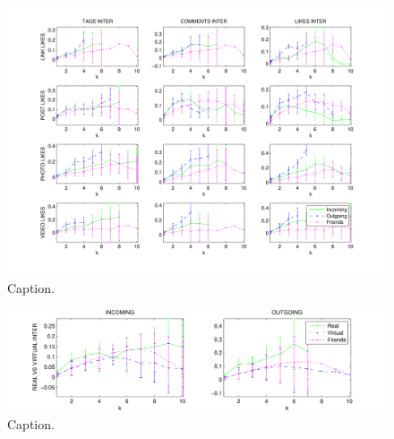 \begin{figure}[t!]
\centering
\includegraphics[scale=0.70]{data/linktype_vs_inter_fix}
\caption{Caption.}
\label{fig:res3}
\end{figure}


\begin{figure}[t!]
\centering
\includegraphics[scale=0.75]{data/real_vs_virtual_fix}
\caption{Caption.}
\label{fig:res4}
\end{figure}

